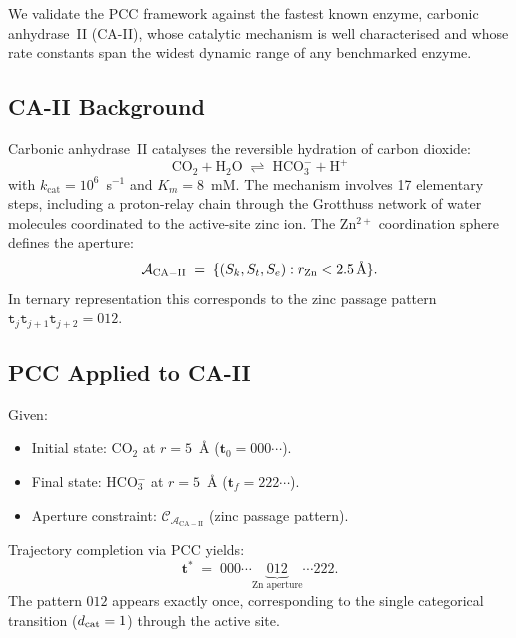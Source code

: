 We validate the PCC framework against the fastest known enzyme, carbonic
anhydrase~II (CA-II), whose catalytic mechanism is well characterised and whose
rate constants span the widest dynamic range of any benchmarked enzyme.

\subsection{CA-II Background}

Carbonic anhydrase~II catalyses the reversible hydration of carbon dioxide:
\[
    \mathrm{CO}_2 + \mathrm{H}_2\mathrm{O}
    \;\rightleftharpoons\;
    \mathrm{HCO}_3^- + \mathrm{H}^+
\]
with $k_\mathrm{cat} = 10^6$~s$^{-1}$ and $K_m = 8$~mM.  The mechanism
involves 17 elementary steps, including a proton-relay chain through the
Grotthuss network of water molecules coordinated to the active-site zinc ion.
The Zn$^{2+}$ coordination sphere defines the aperture:
\[
    \mathcal{A}_\mathrm{CA-II}
    \;=\; \{(S_k, S_t, S_e) : r_\mathrm{Zn} < 2.5\,\text{\AA}\}.
\]
In ternary representation this corresponds to the zinc passage pattern
$\mathtt{t}_j\mathtt{t}_{j+1}\mathtt{t}_{j+2} = 012$.

\subsection{PCC Applied to CA-II}

Given:
\begin{itemize}[noitemsep]
    \item Initial state: CO$_2$ at $r = 5$~\AA{} ($\mathbf{t}_0 = 000\cdots$).
    \item Final state: HCO$_3^-$ at $r = 5$~\AA{} ($\mathbf{t}_f = 222\cdots$).
    \item Aperture constraint: $\mathcal{C}_{\mathcal{A}_\mathrm{CA-II}}$ (zinc
          passage pattern).
\end{itemize}
Trajectory completion via PCC yields:
\[
    \mathbf{t}^* \;=\; 000\cdots\underbrace{012}_\text{Zn aperture}\cdots 222.
\]
The pattern $012$ appears exactly once, corresponding to the single categorical
transition ($d_{\mathrm{cat}} = 1$) through the active site.

